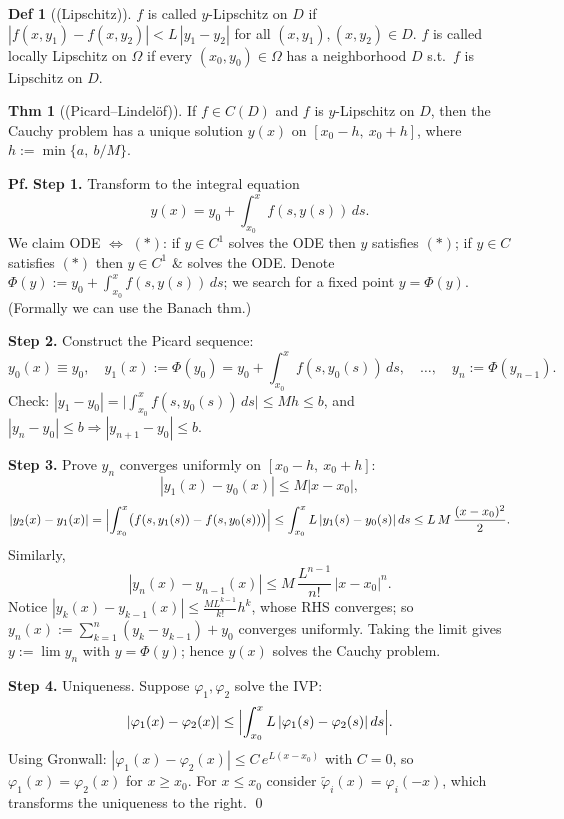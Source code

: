 \documentclass[11pt]{article}
\theoremstyle{definition}
\newtheorem*{definition}{Def}
\newtheorem*{theorem}{Thm}
\theoremstyle{remark}
\begin{document}
\begin{definition}[(Lipschitz)]
$f$ is called $y$-Lipschitz on $D$ if $|f(x,y_1) - f(x,y_2)| < L\,|y_1 - y_2|$ for all
$(x,y_1), (x,y_2)\in D$. $f$ is called locally Lipschitz on $\Omega$ if every $(x_0,y_0)\in\Omega$
has a neighborhood $D$ s.t.\ $f$ is Lipschitz on $D$.
\end{definition}

\begin{theorem}[(Picard--Lindel\"of)]
If $f \in C(D)$ and $f$ is $y$-Lipschitz on $D$, then the Cauchy problem has a unique solution
$y(x)$ on $[x_0 - h,\ x_0 + h]$, where $h := \min\{a,\ b/M\}$.
\end{theorem}

\textbf{Pf.}
\textbf{Step 1.} Transform to the integral equation
\begin{equation}
y(x) = y_0 + \int_{x_0}^{x} f(s, y(s))\, ds. \tag{$*$}
\end{equation}
We claim ODE $\iff$ $(*)$: if $y \in C^1$ solves the ODE then $y$ satisfies $(*)$; if $y \in C$
satisfies $(*)$ then $y \in C^1$ \& solves the ODE. Denote
$\Phi(y) := y_0 + \int_{x_0}^{x} f(s, y(s))\, ds$; we search for a fixed point $y = \Phi(y)$.
(Formally we can use the Banach thm.)

\textbf{Step 2.} Construct the Picard sequence:
\[
y_0(x) \equiv y_0, \quad y_1(x) := \Phi(y_0) = y_0 + \int_{x_0}^{x} f(s, y_0(s))\, ds,
\quad \ldots, \quad y_n := \Phi(y_{n-1}).
\]
Check: $|y_1 - y_0| = \bigl|\int_{x_0}^{x} f(s, y_0(s))\, ds\bigr| \le M h \le b$, and
$|y_n - y_0| \le b \Rightarrow |y_{n+1} - y_0| \le b$.

\textbf{Step 3.} Prove $y_n$ converges uniformly on $[x_0 - h,\ x_0 + h]$:
\[
|y_1(x) - y_0(x)| \le M|x - x_0|,
\]
\[
|y_2(x) - y_1(x)| = \Bigl|\int_{x_0}^{x} \bigl(f(s, y_1(s)) - f(s, y_0(s))\bigr)\Bigr|
\le \int_{x_0}^{x} L\,|y_1(s) - y_0(s)|\, ds \le L\,M\,\frac{(x - x_0)^2}{2}.
\]
Similarly,
\[
|y_n(x) - y_{n-1}(x)| \le M\,\frac{L^{n-1}}{n!}\,|x - x_0|^n.
\]
Notice $|y_k(x) - y_{k-1}(x)| \le \frac{M L^{k-1}}{k!}h^k$, whose RHS converges; so
$y_n(x) := \sum_{k=1}^{n} (y_k - y_{k-1}) + y_0$ converges uniformly. Taking the limit gives
$y := \lim y_n$ with $y = \Phi(y)$; hence $y(x)$ solves the Cauchy problem.

\textbf{Step 4.} Uniqueness. Suppose $\varphi_1, \varphi_2$ solve the IVP:
\[
|\varphi_1(x) - \varphi_2(x)| \le \Bigl|\int_{x_0}^{x} L\,|\varphi_1(s) - \varphi_2(s)|\, ds\Bigr|.
\]
Using Gronwall: $|\varphi_1(x) - \varphi_2(x)| \le C\, e^{L(x - x_0)}$ with $C = 0$, so
$\varphi_1(x) = \varphi_2(x)$ for $x \ge x_0$. For $x \le x_0$ consider
$\tilde{\varphi}_i(x) = \varphi_i(-x)$, which transforms the uniqueness to the right. \qed
\end{document}
